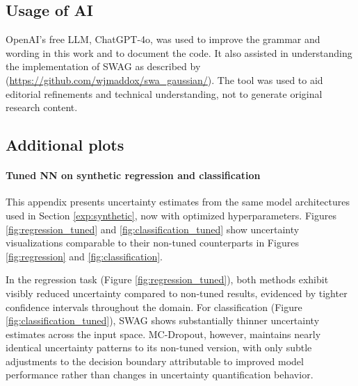 
\subsection{Usage of AI}

OpenAI’s free LLM, ChatGPT-4o, was used to improve the grammar and wording in this work and to document the code. It also assisted in understanding the implementation of SWAG as described by \citet{maddox2019swag} (\url{https://github.com/wjmaddox/swa_gaussian/}). The tool was used to aid editorial refinements and technical understanding, not to generate original research content.


\subsection{Additional plots}

\paragraph{Tuned NN on synthetic regression and classification}
This appendix presents uncertainty estimates from the same model architectures used in Section
\ref{exp:synthetic}, now with optimized hyperparameters. Figures \ref{fig:regression_tuned} and
\ref{fig:classification_tuned} show uncertainty visualizations comparable to their non-tuned counterparts
in Figures \ref{fig:regression} and \ref{fig:classification}.

In the regression task (Figure \ref{fig:regression_tuned}), both methods exhibit visibly reduced
uncertainty compared to non-tuned results, evidenced by tighter confidence intervals throughout the domain.
For classification (Figure \ref{fig:classification_tuned}), SWAG shows substantially thinner uncertainty
estimates across the input space. MC-Dropout, however, maintains nearly identical uncertainty patterns to
its non-tuned version, with only subtle adjustments to the decision boundary attributable to improved model
performance rather than changes in uncertainty quantification behavior.

\FloatBarrier

